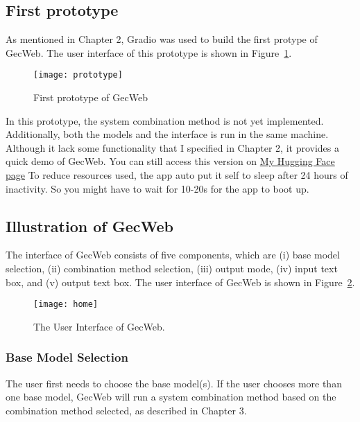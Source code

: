 \subsection{First prototype}

As mentioned in Chapter 2, Gradio was used to build the first protype of GecWeb.
The user interface of this prototype is shown in Figure~\ref{fig:prototype}.

\begin{figure}[htbp]
  \begin{center}
    \texttt{[image: prototype]}
  \end{center}
  \caption{First prototype of GecWeb}\label{fig:prototype}
\end{figure}

In this prototype, the system combination method is not yet implemented.
Additionally, both the models and the interface is run in the same machine.
Although it lack some functionality that I specified in Chapter 2, it provides a quick demo of GecWeb.
You can still access this version on \href{https://huggingface.co/spaces/canh25xp/gector_demo}{My Hugging Face page}
To reduce resources used, the app auto put it self to sleep after 24 hours of inactivity.
So you might have to wait for 10-20s for the app to boot up.

\subsection{Illustration of GecWeb}

The interface of GecWeb consists of five components, which are (i) base model selection, (ii) combination method selection, (iii) output mode, (iv) input text box, and (v) output text box.
The user interface of GecWeb is shown in Figure~\ref{fig:home}.

\begin{figure}[htbp]
  \begin{center}
    \texttt{[image: home]}
  \end{center}
  \caption{The User Interface of GecWeb.}\label{fig:home}
\end{figure}

\subsubsection{Base Model Selection}

The user first needs to choose the base model(s).
If the user chooses more than one base model, GecWeb will run a system combination method based on the combination method selected, as described in Chapter 3.

